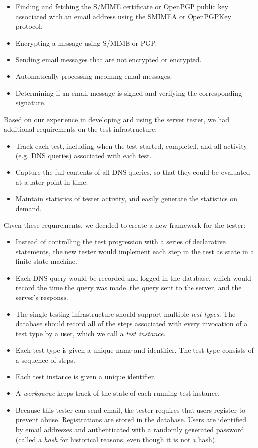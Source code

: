 \documentclass[preprint,3p]{elsarticle}
\begin{document}
\begin{itemize}
\item Finding and fetching the S/MIME certificate or OpenPGP public
  key associated with an email address using the SMIMEA or OpenPGPKey
  protocol.
\item Encrypting a message using S/MIME or PGP.
\item Sending email messages that are not encrypted or encrypted.
\item Automatically processing incoming email messages.
\item Determining if an email message is signed and verifying the
  corresponding signature. 
\end{itemize}

\noindent Based on our experience in developing and using the server tester, we
had additional requirements on the test infrastructure:

\begin{itemize}
\item Track each test, including when the test started, completed, and
  all activity (e.g. DNS queries) associated with each test.
\item Capture the full contents of all DNS queries, so that they could
  be evaluated at a later point in time.
\item Maintain statistics of tester activity, and easily generate the
  statistics on demand.
\end{itemize}

\noindent Given these requirements, we decided to create a new framework for the
tester:

\begin{itemize}
\item Instead of controlling the test progression with a series of
  declarative statements, the new tester would implement each
  step in the test as state in a finite state machine. 
\item Each DNS query would be recorded and logged in the database,
  which would record the time the query was made, the query sent to
  the server, and the server's response. 
\item The single testing infrastructure should support multiple \emph{test
  types}. The database should record all of the steps associated with
  every invocation of a test type by a user, which we call a
  \emph{test instance}.
\item Each test type is given a unique name and identifier. The test type
  consists of a sequence of steps.
\item Each test instance is given a unique identifier. 
\item A \emph{workqueue} keeps track of the state of each running test instance.
\item Because this tester can send email, the tester requires that
  users register to prevent abuse. Registrations are stored in the
  database. Users are identified by email addresses and authenticated
  with a randomly generated password (called a \emph{hash} for
  historical reasons, even though it is not a hash). 
\end{itemize}
\end{document}

